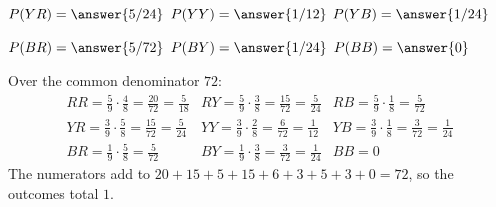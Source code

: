 \documentclass[12pt]{ximera}
\begin{document}
\begin{problem}
\begin{prompt}
\smallskip
$P(YR)=\answer{5/24}$ \quad $P(YY)=\answer{1/12}$ \quad $P(YB)=\answer{1/24}$

\smallskip
$P(BR)=\answer{5/72}$ \quad $P(BY)=\answer{1/24}$ \quad $P(BB)=\answer{0}$

\begin{feedback}
Over the common denominator $72$:
\[
\begin{array}{lll}
RR=\frac59\cdot\frac48=\frac{20}{72}=\frac5{18} & RY=\frac59\cdot\frac38=\frac{15}{72}=\frac5{24} & RB=\frac59\cdot\frac18=\frac5{72}\\[4pt]
YR=\frac39\cdot\frac58=\frac{15}{72}=\frac5{24} & YY=\frac39\cdot\frac28=\frac6{72}=\frac1{12} & YB=\frac39\cdot\frac18=\frac3{72}=\frac1{24}\\[4pt]
BR=\frac19\cdot\frac58=\frac5{72} & BY=\frac19\cdot\frac38=\frac3{72}=\frac1{24} & BB=0
\end{array}
\]
The numerators add to $20+15+5+15+6+3+5+3+0=72$, so the outcomes total $1$.
\checkmark
\end{feedback}
\end{prompt}
\end{problem}
\end{document}
